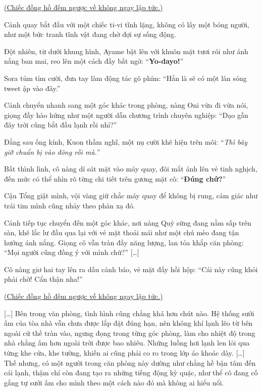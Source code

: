 \documentclass[../main.tex]{subfiles}
\begin{document}
\begin{center}
  \uline{(Chiếc đồng hồ đếm ngược về không ngay lập tức.)}
\end{center}

Cảnh quay bắt đầu với một chiếc ti-vi tĩnh lặng, không có lấy một bóng người, như một bức tranh tĩnh vật đang chờ đợi sự sống động.

Đột nhiên, từ dưới khung hình, Ayame bật lên với khuôn mặt tươi rói như ánh nắng ban mai, reo lên một cách đầy bất ngờ: ``\textbf{Yo-dayo!}''


Sora tủm tỉm cười, đưa tay làm động tác gõ phím: ``Hẳn là sẽ có một làn sóng tweet ập vào đây.''

Cảnh chuyển nhanh sang một góc khác trong phòng, nàng Oni vừa đi vừa nói, giọng đầy hào hứng như một người dẫn chương trình chuyên nghiệp: ``Dạo gần đây trời cũng bắt đầu lạnh rồi nhỉ?''

Đằng sau ống kính, Kuon thầm nghĩ, một nụ cười khẽ hiện trên môi: ``\textit{Thì bây giờ chuẩn bị vào đông rồi mà.}''

Bất thình lình, cô nàng dí sát mặt vào máy quay, đôi mắt ánh lên vẻ tinh nghịch, đến mức có thể nhìn rõ từng chi tiết trên gương mặt cô: ``\textbf{Đúng chứ?}''

Cậu Tổng giật mình, vội vàng giữ chắc máy quay để không bị rung, cảm giác như trái tim mình cũng nhảy theo phản xạ đó.

Cảnh tiếp tục chuyển đến một góc khác, nơi nàng Quỷ sừng đang nằm sấp trên sàn, khẽ lắc lư đầu qua lại với vẻ mặt thoải mái như một chú mèo đang tận hưởng ánh nắng. Giọng cô vẫn tràn đầy năng lượng, lan tỏa khắp căn phòng: ``Mọi người cũng đồng ý với mình chứ?'' [\dots]



Cô nàng giơ hai tay lên ra dấu cảnh báo, vẻ mặt đầy hồi hộp: ``Cái này cũng khỏi phải chờ! Cẩn thận nha!''

\begin{center}
  \uline{(Chiếc đồng hồ đếm ngược về không ngay lập tức.)}
\end{center}

[\dots] Bên trong văn phòng, tình hình cũng chẳng khá hơn chút nào. Hệ thống sưởi ấm của tòa nhà vẫn chưa được lắp đặt đúng hạn, nên không khí lạnh lẽo từ bên ngoài cứ thế tràn vào, ngưng đọng trong từng góc phòng, làm cho nhiệt độ trong nhà chẳng ấm hơn ngoài trời được bao nhiêu. Những luồng hơi lạnh len lỏi qua từng khe cửa, khe tường, khiến ai cũng phải co ro trong lớp áo khoác dày. [\dots] Thế nhưng, có một người trong căn phòng này dường như chẳng hề bận tâm đến cái lạnh, thậm chí còn đang tạo ra những tiếng động kỳ quặc, như thể cô đang cố gắng tự sưởi ấm cho mình theo một cách nào đó mà không ai hiểu nổi.
\end{document}

